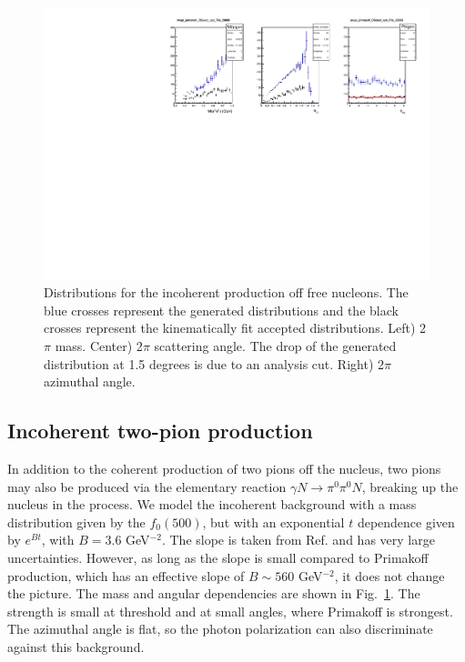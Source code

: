 \begin{figure}[tbp]
\begin{center}
\includegraphics[width=16cm,clip=true]{figures/twopi_primakoff_DSelect_test_File_20000_IC.pdf}
\caption{Distributions for the incoherent production off free nucleons. The blue crosses represent the generated distributions and the black crosses represent the kinematically fit accepted distributions.
Left) 2$\pi$ mass. Center) 2$\pi$ scattering angle. The drop of the generated distribution at 1.5 degrees is due to an analysis cut. Right) 2$\pi$ azimuthal angle.
\label{fig:IC}}
\end{center} 
\end{figure}

\subsection{Incoherent two-pion production}
In addition to the coherent production of two pions off the nucleus,
two pions may also be produced via the elementary reaction $\gamma
N\to \pi^0 \pi^0 N$, breaking up the nucleus in the process. We model
the incoherent background with a mass distribution given by the
$f_0(500)$, but with an exponential $t$ dependence given by $e^{Bt}$,
with $B=3.6$ GeV$^{-2}$. The slope is taken from
Ref.\cite{Battaglieri:2009aa} and has very large
uncertainties. However, as long as the slope is small compared to
Primakoff production, which has an effective slope of $B\sim560$
GeV$^{-2}$, it does not change the picture. The mass and angular
dependencies are shown in Fig.~\ref{fig:IC}. The strength is small at
threshold and at small angles, where Primakoff is strongest. The
azimuthal angle is flat, so the photon polarization can also
discriminate against this background.

